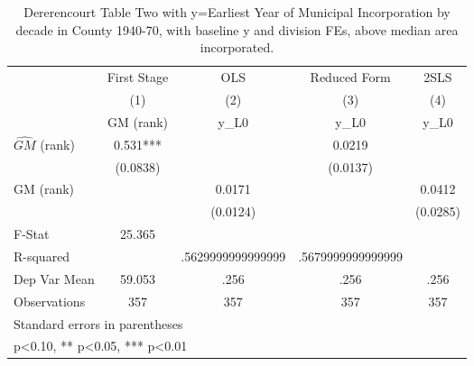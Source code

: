 \begin{table}[htbp]\centering
\def\sym#1{\ifmmode^{#1}\else\(^{#1}\)\fi}
\caption{Dererencourt Table Two with y=Earliest Year of Municipal Incorporation by decade in County 1940-70, with baseline y and division FEs, above median area incorporated.}
\begin{tabular}{l*{4}{c}}
\toprule
                    & First Stage   &         OLS   &Reduced Form   &        2SLS   \\
                    &\multicolumn{1}{c}{(1)}&\multicolumn{1}{c}{(2)}&\multicolumn{1}{c}{(3)}&\multicolumn{1}{c}{(4)}\\
                    &\multicolumn{1}{c}{GM  (rank)}&\multicolumn{1}{c}{y\_L0}&\multicolumn{1}{c}{y\_L0}&\multicolumn{1}{c}{y\_L0}\\
\midrule
$\hat{GM}$ (rank)   &       0.531***&               &      0.0219   &               \\
                    &    (0.0838)   &               &    (0.0137)   &               \\
\addlinespace
GM  (rank)          &               &      0.0171   &               &      0.0412   \\
                    &               &    (0.0124)   &               &    (0.0285)   \\
\midrule
F-Stat              &      25.365   &               &               &               \\
R-squared           &               &.5629999999999999   &.5679999999999999   &               \\
Dep Var Mean        &      59.053   &        .256   &        .256   &        .256   \\
Observations        &         357   &         357   &         357   &         357   \\
\bottomrule
\multicolumn{5}{l}{\footnotesize Standard errors in parentheses}\\
\multicolumn{5}{l}{\footnotesize * p<0.10, ** p<0.05, *** p<0.01}\\
\end{tabular}
\end{table}
